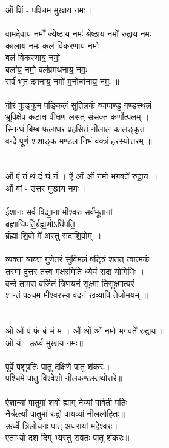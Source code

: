 ओं  शिं - पश्चिम मुखाय नमः॥\\
\\
वा॒म॒दे॒वाय॒ नमो᳚ ज्ये॒ष्ठाय॒ नमः॑ श्रे॒ष्ठाय॒ नमो॑ रु॒द्राय॒ नमः॒ \\
काला॑य नमः॒ कल॑ विकरणाय॒ नमो॒ \\
बल॑ विकरणाय॒ नमो॒\\
बला॑य॒ नमो॒ बल॑प्रमथनाय॒ नमः॒ \\
सर्व॑ भूत दमनाय॒ नमो॑ म॒नोन्म॑नाय॒ नमः॒ ॥\\
\\
गौरं कुङ्कुम पङ्किलं सुतिलकं व्यापाण्डु गण्डस्थलं\\
भ्रूविक्षेप कटाक्ष वीक्षण लसत् संसक्त कर्णोत्पलम् ।\\
स्निग्धं बिम्ब फलाधर प्रहसितं नीलाल कालङ्कृतं\\
वन्दे पूर्ण शशाङ्क मण्डल निभं वक्त्रं हरस्योत्तरम् ॥\\
 \\
\\
ओं एं तं थं दं घं नं । ऐं ओं ओं नमो भगवते॑ रुद्रा॒य ॥\\
ओं वां - उत्तर मुखाय नमः॥\\
\\
ईशानः सर्व॑ विद्या॒ना॒ मीश्वरः सर्व॑भूता॒नां॒\\
ब्रह्माधि॑पति॒र्ब्रह्म॒णोऽधि॑पति॒ \\
र्ब्रह्मा॑ शि॒वो मे॑ अस्तु सदाशि॒वोम् ॥\\
\\
व्यक्ता व्यक्त गुणेतरं सुविमलं षट्त्रिं शतत् त्वात्मकं\\
तस्मा दुत्तर तत्त्व मक्षरमिति ध्येयं सदा योगिभिः ।\\
वन्दे तामस वर्जितं त्रिणयनं सूक्ष्मा तिसूक्ष्मात्परं\\
शान्तं पञ्चम मीश्वरस्य वदनं खव्यापि तेजोमयम् ॥\\
\\
\\
ओं ओं पं फं बं भं मं । औं ओं ओं नमो भगवते॑ रुद्रा॒य ॥\\
ओं यं - ऊर्ध्व मुखाय नमः॥\\
\\
पूर्वे पशुपतिः पातु दक्षिणे पातु शंकरः।\\
पश्चिमे पातु विश्वेशो नीलकण्ठस्तथोत्तरे॥\\
\\
ऐशान्यां पातुमां शर्वो ह्याग् नेय्यां पार्वती पतिः।\\
नैर्ऋर्त्यां पातुमां रुद्रो वायव्यां नीललोहितः॥\\
ऊर्ध्वे त्रिलोचनः पात् अधरायां महेश्वरः।\\
एताभ्यो दश दिग् भ्यस्तु सर्वतः पातु शंकरः॥\\
\\
